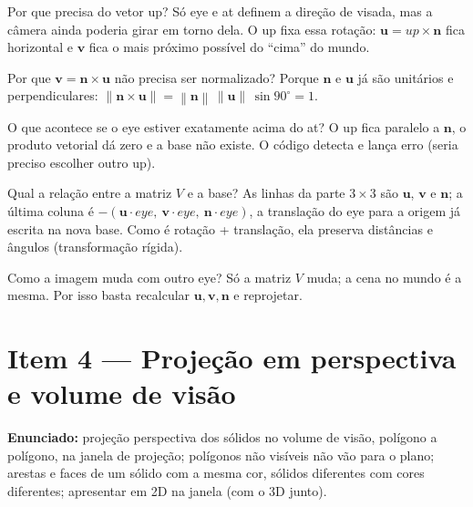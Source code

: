 \documentclass[11pt,a4paper]{article}
\newcommand{\novasecao}{\clearpage}
\newcommand{\vetor}[1]{\mathbf{#1}}
\newcommand{\norm}[1]{\left\lVert #1 \right\rVert}
\begin{document}
\begin{pergunta}{Por que precisa do vetor up?}
Só eye e at definem a direção de visada, mas a câmera ainda poderia girar em torno dela. O up fixa
essa rotação: $\vetor u = up\times\vetor n$ fica horizontal e $\vetor v$ fica o mais próximo possível do
``cima'' do mundo.
\end{pergunta}

\begin{pergunta}{Por que $\vetor v = \vetor n\times\vetor u$ não precisa ser normalizado?}
Porque $\vetor n$ e $\vetor u$ já são unitários e perpendiculares:
$\norm{\vetor n\times\vetor u} = \norm{\vetor n}\,\norm{\vetor u}\,\sin 90^\circ = 1$.
\end{pergunta}

\begin{pergunta}{O que acontece se o eye estiver exatamente acima do at?}
O up fica paralelo a $\vetor n$, o produto vetorial dá zero e a base não existe. O código detecta e
lança erro (seria preciso escolher outro up).
\end{pergunta}

\begin{pergunta}{Qual a relação entre a matriz $V$ e a base?}
As linhas da parte $3\times3$ são $\vetor u$, $\vetor v$ e $\vetor n$; a última coluna é
$-(\vetor u\cdot eye,\ \vetor v\cdot eye,\ \vetor n\cdot eye)$, a translação do eye para a origem já
escrita na nova base. Como é rotação + translação, ela preserva distâncias e ângulos (transformação rígida).
\end{pergunta}

\begin{pergunta}{Como a imagem muda com outro eye?}
Só a matriz $V$ muda; a cena no mundo é a mesma. Por isso basta recalcular $\vetor u, \vetor v, \vetor n$
e reprojetar.
\end{pergunta}

\novasecao
\section{Item 4 — Projeção em perspectiva e volume de visão}

\begin{enunciado}
\textbf{Enunciado:} projeção perspectiva dos sólidos no volume de visão, polígono a polígono, na
janela de projeção; polígonos não visíveis não vão para o plano; arestas e faces de um sólido com a
mesma cor, sólidos diferentes com cores diferentes; apresentar em 2D na janela (com o 3D junto).
\end{enunciado}
\end{document}
